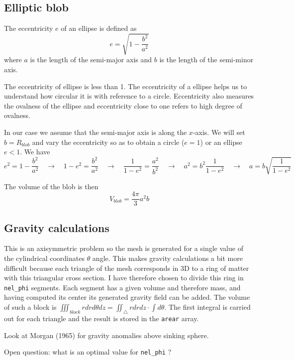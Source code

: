 \subsection*{Elliptic blob}

The eccentricity $e$ of an ellipse is defined as 
\[
e=\sqrt{1-\frac{b^2}{a^2}}
\]
where $a$ is the length of the semi-major axis and $b$ is the length of the semi-minor axis.

The eccentricity of ellipse is less than 1. The eccentricity of a ellipse helps us to understand how circular it is with reference to a circle. Eccentricity also measures the ovalness of the ellipse and eccentricity close to one refers to high degree of ovalness.

In our case we assume that the semi-major axis is along the $x$-axis.
We will set $b=R_{blob}$ and vary the eccentricity so as to obtain a circle ($e=1$) or an ellipse $e<1$.
We have
\[
e^2 = 1 -\frac{b^2}{a^2}
\quad
\rightarrow
\quad
1-e^2 = \frac{b^2}{a^2}
\quad
\rightarrow
\quad
\frac{1}{1-e^2} = \frac{a^2}{b^2}
\quad
\rightarrow
\quad
a^2 = b^2 \frac{1}{1-e^2} 
\quad
\rightarrow
\quad
a = b \sqrt{\frac{1}{1-e^2}}
\]

The volume of the blob is then 
\[
V_{blob} = \frac{4\pi}{3}a^2b
\]


 
\subsection*{Gravity calculations}

This is an axisymmetric problem so the mesh is generated for a single 
value of the cylindrical coordinates $\theta$ angle. 
This makes gravity calculations a bit more difficult because each triangle 
of the mesh corresponds in 3D to a ring of matter with this triangular cross section. 
I have therefore chosen to divide this ring in {\tt nel\_phi} segments. 
Each segment has a given volume and therefore mass, 
and having computed its center its generated gravity field can be added. 
The volume of such a block is 
$\iiint_{block} r dr d\theta dz =\iint_\triangle rdrdz \cdot \int d\theta$.  
The first integral is carried out for each triangle and the result is stored 
in the {\tt arear} array. 


Look at Morgan (1965) \cite{morg65} for gravity anomalies above sinking sphere. 

Open question: what is an optimal value for {\tt nel\_phi} ?











